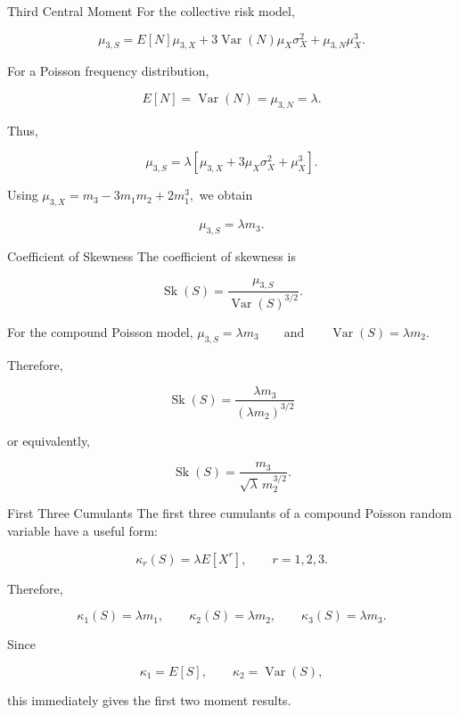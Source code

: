\documentclass[
  ignorenonframetext,
  aspectratio=169,
]{beamer}
\begin{document}
\begin{frame}{Third Central Moment}
\protect{}\label{third-central-moment-1}
For the collective risk model,

\[
\mu_{3,S}
=
E[N]\mu_{3,X}
+
3\operatorname{Var}(N)\mu_X\sigma_X^2
+
\mu_{3,N}\mu_X^3.
\]

For a Poisson frequency distribution,

\[
E[N]=\operatorname{Var}(N)=\mu_{3,N}=\lambda.
\]

Thus,

\[
\mu_{3,S}
=
\lambda
\left[
\mu_{3,X}
+3\mu_X\sigma_X^2
+\mu_X^3
\right].
\]

Using \(\mu_{3,X}=m_3-3m_1m_2+2m_1^3,\) we obtain

\[
\boxed{\mu_{3,S}=\lambda m_3}.
\]
\end{frame}

\begin{frame}{Coefficient of Skewness}
\protect{}\label{coefficient-of-skewness-1}
The coefficient of skewness is

\[
\operatorname{Sk}(S)
=
\frac{\mu_{3,S}}
{\operatorname{Var}(S)^{3/2}}.
\]

For the compound Poisson model,
\(\mu_{3,S}=\lambda m_3\qquad\text{and}\qquad\operatorname{Var}(S)=\lambda m_2.\)

Therefore,

\[
\boxed{
\operatorname{Sk}(S)
=
\frac{\lambda m_3}
{(\lambda m_2)^{3/2}}
}
\]

or equivalently,

\[
\boxed{
\operatorname{Sk}(S)
=
\frac{m_3}
{\sqrt{\lambda}\,m_2^{3/2}}
}.
\]
\end{frame}

\begin{frame}{First Three Cumulants}
\protect{}\label{first-three-cumulants}
The first three cumulants of a compound Poisson random variable have a
useful form:

\[
\boxed{
\kappa_r(S)=\lambda E[X^r],
\qquad r=1,2,3.
}
\]

Therefore,

\[
\boxed{
\kappa_1(S)=\lambda m_1,
\qquad
\kappa_2(S)=\lambda m_2,
\qquad
\kappa_3(S)=\lambda m_3.
}
\]

Since

\[
\kappa_1=E[S],
\qquad
\kappa_2=\operatorname{Var}(S),
\]

this immediately gives the first two moment results.
\end{frame}
\end{document}
